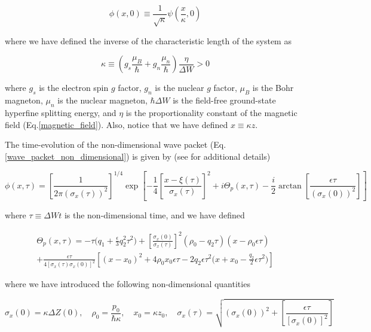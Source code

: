 \documentclass{article}
\begin{document}
\begin{equation}\label{wave_packet_non_dimensional}
\phi(x,0) \equiv \frac{1}{\sqrt{\kappa}} \psi(\frac{x}{\kappa}, 0)
\end{equation}

where we have defined the inverse of the characteristic length of the system as

\begin{equation}\label{kappa}
\kappa \equiv (g_{s}\frac{\mu_{B}}{\hbar} + g_{n}\frac{\mu_{n}}{\hbar}) \frac{\eta}{\Delta W} > 0
\end{equation}

where $g_{s}$ is the electron spin $g$ factor, $g_{n}$ is the nuclear $g$ factor, $\mu_{B}$ is the Bohr magneton, $\mu_{n}$ is the nuclear magneton, $\hbar \Delta W$ is the field-free ground-state hyperfine splitting energy, and $\eta$ is the proportionality constant of the magnetic field (Eq.\ref{magnetic_field}). Also, notice that we have defined $x \equiv \kappa z$.

The time-evolution of the non-dimensional wave packet (Eq.\ref{wave_packet_non_dimensional}) is given by (see \cite{Castanos2014} for additional details)

\begin{equation}\label{wave_packet_non_dimensional_evolution}
\phi(x,\tau) = 
\left[\frac{1}{2 \pi (\sigma_{x}(\tau))^2} \right]^{1/4} \exp \left[-\frac{1}{4} \left[\frac{x-\xi(\tau)}{\sigma_{x}(\tau)}\right]^{2}  + i\Theta_{p}(x, \tau) - \frac{i}{2}\arctan\left[\frac{\epsilon \tau}{(\sigma_{x}(0))^{2}}\right] \right]
\end{equation}

where $\tau\equiv \Delta W t$ is the non-dimensional time, and we have defined 

\begin{multline}\label{theta_p}
\Theta_{p}(x,\tau) = -\tau \bigg(q_{1} + \frac{\epsilon}{3} q_{2}^{2} \tau^{2}\bigg) + \left[\frac{\sigma_{x}(0)}{\sigma_{x}(\tau)} \right]^{2} (\rho_{0} - q_{2} \tau)(x-\rho_{0} \epsilon \tau) \\
+ \frac{\epsilon \tau}{4 [\sigma_{x}(\tau)\sigma_{x}(0)]^{2}} \left[(x-x_{0})^{2} + 4\rho_{0} x_{0} \epsilon \tau -2q_{2} \epsilon \tau^{2} \bigg(x+x_{0}- \frac{q_{2}}{2} \epsilon \tau^{2} \bigg)\right]
\end{multline}

where we have introduced the following non-dimensional quantities

\begin{equation}\label{non_dimensional_definitions}
\sigma_{x}(0) = \kappa \Delta Z(0)\mathrm{,}\quad \rho_{0}=\frac{p_{0}}{\hbar \kappa} \mathrm{,}\quad 
x_{0}=\kappa z_{0} \mathrm{,}\quad 
\sigma_{x}(\tau) = \sqrt{(\sigma_{x}(0))^{2} + \left[\frac{\epsilon \tau}{[\sigma_{x}(0)]^{2}} \right]}
\end{equation}
\end{document}
